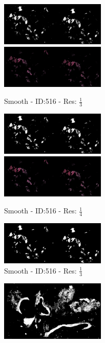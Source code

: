 \documentclass[a4paper,10pt,oneside]{article}
\begin{document}
\begin{figure}[hbtp]
  \begin{subfigure}[b]{5cm}
    \includegraphics[width=5cm]{visualization/results/smoothhistogram/res_reduce_3/Region_0_PO13-00516A1_1_7_201305171148.png}
    \includegraphics[width=5cm]{visualization/results/smoothhistogram/res_reduce_3/Region_1_PO13-00516A1_1_7_201305171148.png}
    \caption{Smooth - ID:516 - Res: $\frac{1}{3}$}
  \end{subfigure}
  \begin{subfigure}[b]{5cm}
    \includegraphics[width=5cm]{visualization/results/smoothhistogram/res_reduce_4/Region_0_PO13-00516A1_1_7_201305171148.png}
    \includegraphics[width=5cm]{visualization/results/smoothhistogram/res_reduce_4/Region_1_PO13-00516A1_1_7_201305171148.png}
    \caption{Smooth - ID:516 - Res: $\frac{1}{4}$}
  \end{subfigure}
  \begin{subfigure}[b]{5cm}
    \includegraphics[width=5cm]{visualization/results/smoothhistogram/res_reduce_5/Region_0_PO13-00516A1_1_7_201305171148.png}
    \caption{Smooth - ID:516 - Res: $\frac{1}{3}$}
  \end{subfigure}
  \begin{subfigure}[b]{5cm}
    \includegraphics[width=5cm]{visualization/results/smoothhistogram/res_reduce_3/Region_0_PO13-00522A1_1_2_201305171639.png}

\end{subfigure}
\end{figure}
\end{document}

